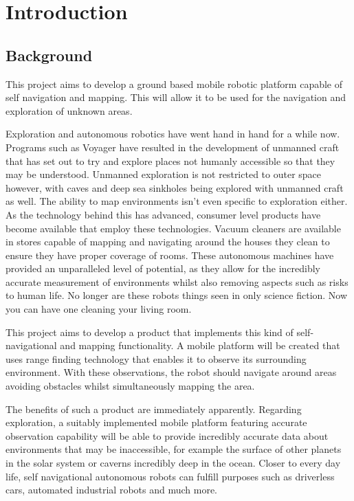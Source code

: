 \chapter{Introduction}\label{introduction}
	\section{Background}
	This project aims to develop a ground based mobile robotic platform capable of self navigation and mapping. This will allow it to be used for the navigation and exploration of unknown areas.
	
	Exploration and autonomous robotics have went hand in hand for a while now. Programs such as Voyager have resulted in the development of unmanned craft that has set out to try and explore places not humanly accessible so that they may be understood. Unmanned exploration is not restricted to outer space however, with caves\citep{mcfarlane2013integrated} and deep sea sinkholes\citep{carnegie2007sinkhole} being explored with unmanned craft as well. The ability to map environments isn't even specific to exploration either. As the technology behind this has advanced, consumer level products have become available that employ these technologies. Vacuum cleaners are available in stores capable of mapping and navigating around the houses they clean to ensure they have proper coverage of rooms. These autonomous machines have provided an unparalleled level of potential, as they allow for the incredibly accurate measurement of environments whilst also removing aspects such as risks to human life. No longer are these robots things seen in only science fiction. Now you can have one cleaning your living room.
	
	This project aims to develop a product that implements this kind of self-navigational and mapping functionality. A mobile platform will be created that uses range finding technology that enables it to observe its surrounding environment. With these observations, the robot should navigate around areas avoiding obstacles whilst simultaneously mapping the area.
	
	The benefits of such a product are immediately apparently. Regarding exploration, a suitably implemented mobile platform featuring accurate observation capability will be able to provide incredibly accurate data about environments that may be inaccessible, for example the surface of other planets in the solar system or caverns incredibly deep in the ocean. Closer to every day life, self navigational autonomous robots can fulfill purposes such as driverless cars, automated industrial robots and much more.
	
